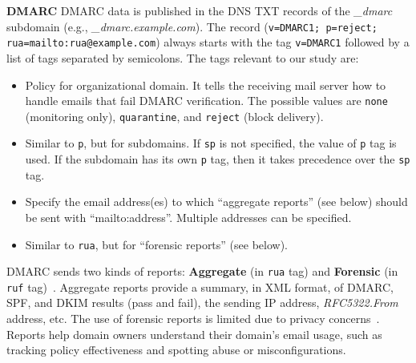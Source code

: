 \textbf{\acrfull{DMARC}}
\gls{DMARC} data is published in the \gls{DNS} TXT records of the \textit{\_dmarc} subdomain (e.g., \textit{\_dmarc.example.com}). The record (\eg \texttt{v=DMARC1; p=reject; rua=mailto:rua@example.com}) always starts with the tag \texttt{v=DMARC1} followed by a list of tags separated by semicolons. The tags relevant to our study are:
\begin{itemize}
    \item[p] Policy for organizational domain. It tells the receiving mail server how to handle emails that fail \gls{DMARC} verification. The possible values are \texttt{none} (monitoring only), \texttt{quarantine}, and \texttt{reject} (block delivery).
    \item[sp] Similar to \texttt{p}, but for subdomains. If \texttt{sp} is not specified, the value of \texttt{p} tag is used. If the subdomain has its own \texttt{p} tag, then it takes precedence over the \texttt{sp} tag.
    \item[rua] Specify the email address(es) to which ``aggregate reports'' (see below) should be sent with ``mailto:address''. Multiple addresses can be specified.
    \item[ruf] Similar to \texttt{rua}, but for ``forensic reports'' (see below).
\end{itemize}


\gls{DMARC} sends two kinds of reports: \textbf{Aggregate} (in \texttt{rua} tag) and \textbf{Forensic} (in \texttt{ruf} tag)~\cite{rfc7489}. Aggregate reports provide a summary, in XML format, of \gls{DMARC}, \gls{SPF}, and \gls{DKIM} results (pass and fail), the sending IP address, \textit{RFC5322.From} address, etc.
The use of forensic reports is limited due to privacy concerns~\cite{hureau_stress_testing,_BSITR03182Email_}.
Reports help domain owners understand their domain's email usage, such as tracking policy effectiveness and spotting abuse or misconfigurations.


